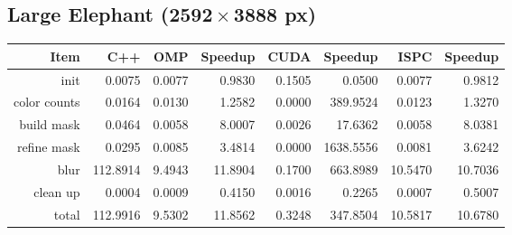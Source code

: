 \documentclass[12pt]{article}
\begin{document}
\subsection{Large Elephant ($\mathbf{2592 \times 3888}$ px)}

\begin{tabular}{r|r|r|r|r|r|r|r}
    Item & C++ & OMP & Speedup & CUDA & Speedup & ISPC & Speedup
\\  \hline
    init & 0.0075 & 0.0077 & 0.9830 & 0.1505 & 0.0500 & 0.0077 & 0.9812
\\  color counts & 0.0164 & 0.0130 & 1.2582 & 0.0000 & 389.9524 & 0.0123 & 1.3270
\\  build mask & 0.0464 & 0.0058 & 8.0007 & 0.0026 & 17.6362 & 0.0058 & 8.0381
\\  refine mask & 0.0295 & 0.0085 & 3.4814 & 0.0000 & 1638.5556 & 0.0081 & 3.6242
\\  blur & 112.8914 & 9.4943 & 11.8904 & 0.1700 & 663.8989 & 10.5470 & 10.7036
\\  clean up & 0.0004 & 0.0009 & 0.4150 & 0.0016 & 0.2265 & 0.0007 & 0.5007
\\  \hline
    total & 112.9916 & 9.5302 & 11.8562 & 0.3248 & 347.8504 & 10.5817 & 10.6780
\end{tabular}
\end{document}

